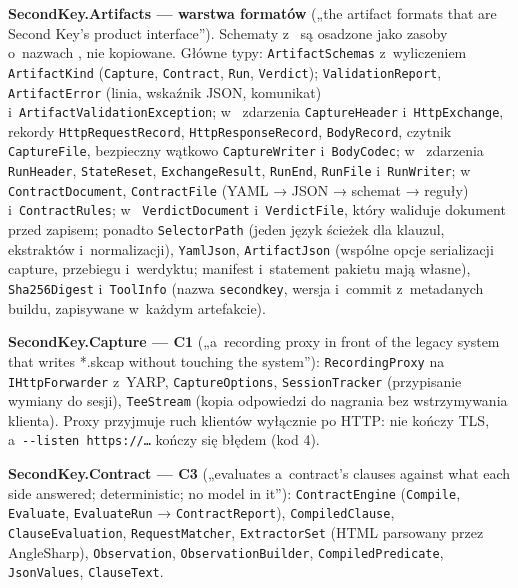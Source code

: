{\raggedright
\textbf{SecondKey.Artifacts --- warstwa formatów} („the artifact formats that are Second
Key's product interface”). Schematy z~ są osadzone jako zasoby o~nazwach
, nie kopiowane. Główne typy: \texttt{ArtifactSchemas} z~wyliczeniem
\texttt{ArtifactKind} (\texttt{Capture}, \texttt{Contract}, \texttt{Run}, \texttt{Verdict});
\texttt{ValidationReport}, \texttt{ArtifactError} (linia, wskaźnik JSON, komunikat) i~\texttt{ArtifactValidationException}; w~ zdarzenia \texttt{CaptureHeader} i~\texttt{HttpExchange}, rekordy \texttt{HttpRequestRecord}, \texttt{HttpResponseRecord},
\texttt{BodyRecord}, czytnik \texttt{CaptureFile}, bezpieczny wątkowo \texttt{CaptureWriter}
i~\texttt{BodyCodec}; w~ zdarzenia \texttt{RunHeader}, \texttt{StateReset},
\texttt{ExchangeResult}, \texttt{RunEnd}, \texttt{RunFile} i~\texttt{RunWriter}; w~ \texttt{ContractDocument}, \texttt{ContractFile} (YAML → JSON → schemat →
reguły) i~\texttt{ContractRules}; w~ \texttt{VerdictDocument} i~\texttt{VerdictFile}, który waliduje dokument przed zapisem; ponadto \texttt{SelectorPath}
(jeden język ścieżek dla klauzul, ekstraktów i~normalizacji), \texttt{YamlJson},
\texttt{ArtifactJson} (wspólne opcje serializacji capture, przebiegu i~werdyktu; manifest i~statement pakietu mają własne), \texttt{Sha256Digest} i~\texttt{ToolInfo} (nazwa \texttt{secondkey}, wersja i~commit z~metadanych buildu, zapisywane
w~każdym artefakcie).\par
\smallskip
\textbf{SecondKey.Capture --- C1} („a~recording proxy in front of the legacy system that
writes *.skcap without touching the system”): \texttt{RecordingProxy} na
\texttt{IHttpForwarder} z~YARP, \texttt{CaptureOptions}, \texttt{SessionTracker} (przypisanie
wymiany do sesji), \texttt{TeeStream} (kopia odpowiedzi do nagrania bez wstrzymywania
klienta). Proxy przyjmuje ruch klientów wyłącznie po HTTP: nie kończy TLS, a~\texttt{-{}-listen https://…}
kończy się błędem (kod 4).\par
\smallskip
\textbf{SecondKey.Contract --- C3} („evaluates a~contract's clauses against what each side
answered; deterministic; no model in it”): \texttt{ContractEngine} (\texttt{Compile},
\texttt{Evaluate}, \texttt{EvaluateRun} → \texttt{ContractReport}), \texttt{CompiledClause},
\texttt{ClauseEvaluation}, \texttt{RequestMatcher}, \texttt{ExtractorSet} (HTML parsowany
przez AngleSharp), \texttt{Observation}, \texttt{ObservationBuilder},
\texttt{CompiledPredicate}, \texttt{JsonValues}, \texttt{ClauseText}.\par
}
